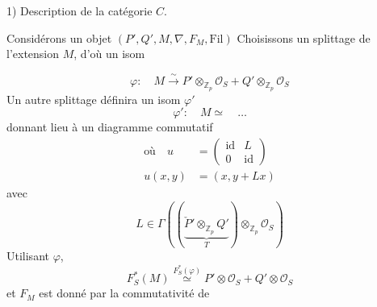 1) Description de la catégorie $C$.

Considérons un objet $(P',Q',M,\nabla,F_M,\mathrm{Fil})$  Choisissons un splittage de l'extension $M$, d'où un isom

\[
\varphi:\quad M\xrightarrow{\sim}P'\otimes_{\mathbb Z_p}\mathcal O_S+Q'\otimes_{\mathbb Z_p}\mathcal O_S
\]
Un autre splittage définira un  isom $\varphi'$
\[
\varphi':\quad M\simeq\quad\ldots
\]
donnant lieu à un diagramme commutatif
\[
\begin{aligned}
\text{où}\quad u&=\begin{pmatrix}\mathrm{id}&L\\0&\mathrm{id}\end{pmatrix}\\
u(x,y)&=(x,y+Lx)
\end{aligned}
\]
avec
\[
L\in\Gamma\left(\left(\underbrace{\check P'\otimes_{\mathbb Z_p}Q'}_{T}\right)\otimes_{\mathbb Z_p}\mathcal O_S\right)
\]
 Utilisant $\varphi$, 
\[
F_S^*(M)\overset{F_S^*(\varphi)}{\simeq} P'\otimes\mathcal O_S+Q'\otimes\mathcal O_S
\]
et $F_M$ est donné par la commutativité de
